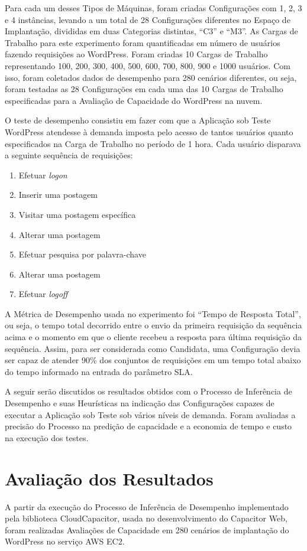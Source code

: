 Para cada um desses Tipos de Máquinas, foram criadas Configurações com 1, 2, 3 e 4
instâncias, levando a um total de 28 Configurações diferentes no Espaço de Implantação,
divididas em duas Categorias distintas, ``C3'' e ``M3''. As Cargas de Trabalho
para este experimento foram quantificadas em número de usuários fazendo
requisições ao WordPress. Foram criadas 10 Cargas de Trabalho representando
100, 200, 300, 400, 500, 600, 700, 800, 900 e 1000 usuários. Com isso, foram
coletados dados de desempenho para 280 cenários diferentes, ou seja, foram 
testadas as 28 Configurações em cada uma das 10 Cargas de Trabalho especificadas 
para a Avaliação de Capacidade do WordPress na nuvem.

O teste de desempenho consistiu em fazer com que a Aplicação sob Teste WordPress
atendesse à demanda imposta pelo acesso de tantos usuários quanto especificados 
na Carga de Trabalho no período de 1 hora. Cada usuário disparava a seguinte
sequência de requisições:

\begin{enumerate}
  \item Efetuar \emph{logon}
  \item Inserir uma postagem
  \item Visitar uma postagem específica
  \item Alterar uma postagem
  \item Efetuar pesquisa por palavra-chave
  \item Alterar uma postagem
  \item Efetuar \emph{logoff}
\end{enumerate}

A Métrica de Desempenho usada no experimento foi ``Tempo de Resposta Total'', ou 
seja, o tempo total decorrido entre o envio da primeira requisição da sequência 
acima e o momento em que o cliente recebeu a resposta para última requisição da
sequência. Assim, para ser considerada como Candidata, uma Configuração devia 
ser capaz de atender 90\% dos conjuntos de requisições em um tempo total abaixo 
do tempo informado na entrada do parâmetro SLA.

A seguir serão discutidos os resultados obtidos com o Processo de Inferência de 
Desempenho e suas Heurísticas na indicação das Configurações capazes de executar
a Aplicação sob Teste sob vários níveis de demanda. Foram avaliadas a precisão do 
Processo na predição de capacidade e a economia de tempo e custo na execução
dos testes.

\section{Avaliação dos Resultados}
\label{sec:resultados_avaliacao}
A partir da execução do Processo de Inferência de Desempenho implementado pela
biblioteca CloudCapacitor, usada no desenvolvimento do Capacitor Web, foram 
realizadas Avaliações de Capacidade em 280 cenários de implantação do WordPress 
no serviço AWS EC2.


